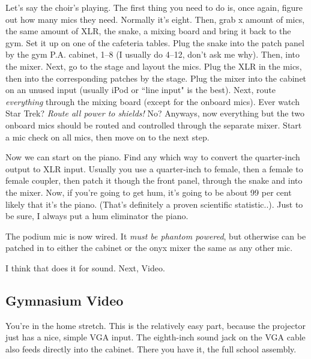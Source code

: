 \documentclass[letterpaper,10pt,oneside,headsepline]{scrreprt}
\begin{document}
Let's say the choir's playing. The first thing you need to do is, once again, figure out how many mics they need. Normally it's eight. Then, grab x amount of mics, the same amount of XLR, the snake, a mixing board and bring it back to the gym. Set it up on one of the cafeteria tables. Plug the snake into the patch panel by the gym P.A. cabinet, 1--8 (I usually do 4--12, don't ask me why). Then, into the mixer. Next, go to the stage and layout the mics. Plug the XLR in the mics, then into the corresponding patches by the stage. Plug the mixer into the cabinet on an unused input (usually iPod or ``line input" is the best). Next, route \textit{everything} through the mixing board (except for the onboard mics). Ever watch Star Trek? \textit{Route all power to shields!} No? Anyways, now everything but the two onboard mics should be routed and controlled through the separate mixer. Start a mic check on all mics, then move on to the next step.

Now we can start on the piano. Find any which way to convert the quarter-inch output to XLR input. Usually you use a quarter-inch to female, then a female to female coupler, then patch it though the front panel, through the snake and into the mixer. Now, if you're going to get hum, it's going to be about 99 per cent likely that it's the piano. (That's definitely a proven scientific statistic..). Just to be sure, I always put a hum eliminator the piano.

The podium mic is now wired. It \textit{must be phantom powered}, but otherwise can be patched in to either the cabinet or the onyx mixer the same as any other mic.

I think that does it for sound. Next, Video.

\subsection{Gymnasium Video}
You're in the home stretch. This is the relatively easy part, because the projector just has a nice, simple VGA input. The eighth-inch sound jack on the VGA cable also feeds directly into the cabinet. There you have it, the full school assembly. 
\end{document}
